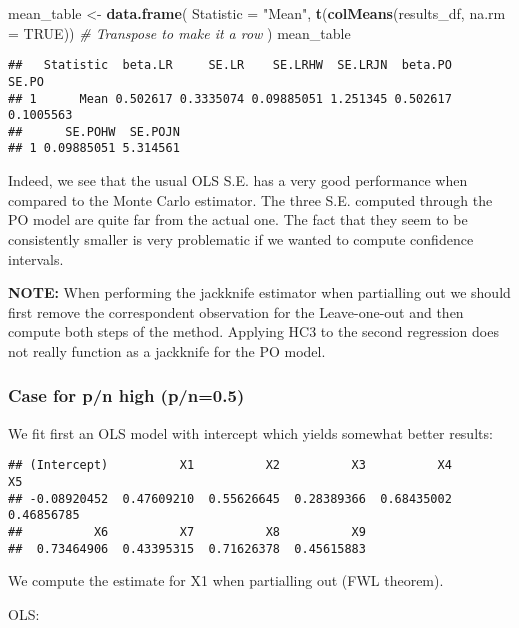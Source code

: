 \documentclass[
]{article}
\newenvironment{Shaded}{\begin{snugshade}}{\end{snugshade}}
\newcommand{\AttributeTok}[1]{\textcolor[rgb]{0.13,0.29,0.53}{#1}}
\newcommand{\CommentTok}[1]{\textcolor[rgb]{0.56,0.35,0.01}{\textit{#1}}}
\newcommand{\ConstantTok}[1]{\textcolor[rgb]{0.56,0.35,0.01}{#1}}
\newcommand{\FunctionTok}[1]{\textcolor[rgb]{0.13,0.29,0.53}{\textbf{#1}}}
\newcommand{\NormalTok}[1]{#1}
\newcommand{\OtherTok}[1]{\textcolor[rgb]{0.56,0.35,0.01}{#1}}
\newcommand{\StringTok}[1]{\textcolor[rgb]{0.31,0.60,0.02}{#1}}
\begin{document}
\begin{Shaded}
\begin{Highlighting}[]
\NormalTok{mean\_table }\OtherTok{\textless{}{-}} \FunctionTok{data.frame}\NormalTok{(}
  \AttributeTok{Statistic =} \StringTok{"Mean"}\NormalTok{,}
  \FunctionTok{t}\NormalTok{(}\FunctionTok{colMeans}\NormalTok{(results\_df, }\AttributeTok{na.rm =} \ConstantTok{TRUE}\NormalTok{))  }\CommentTok{\# Transpose to make it a row}
\NormalTok{)}
\NormalTok{mean\_table}
\end{Highlighting}
\end{Shaded}

\begin{verbatim}
##   Statistic  beta.LR     SE.LR    SE.LRHW  SE.LRJN  beta.PO     SE.PO
## 1      Mean 0.502617 0.3335074 0.09885051 1.251345 0.502617 0.1005563
##      SE.POHW  SE.POJN
## 1 0.09885051 5.314561
\end{verbatim}

Indeed, we see that the usual OLS S.E. has a very good performance when
compared to the Monte Carlo estimator. The three S.E. computed through
the PO model are quite far from the actual one. The fact that they seem
to be consistently smaller is very problematic if we wanted to compute
confidence intervals.

\textbf{NOTE:} When performing the jackknife estimator when partialling
out we should first remove the correspondent observation for the
Leave-one-out and then compute both steps of the method. Applying HC3 to
the second regression does not really function as a jackknife for the PO
model.

\subsubsection{Case for p/n high
(p/n=0.5)}\label{case-for-pn-high-pn0.5}

We fit first an OLS model with intercept which yields somewhat better
results:

\begin{verbatim}
## (Intercept)          X1          X2          X3          X4          X5 
## -0.08920452  0.47609210  0.55626645  0.28389366  0.68435002  0.46856785 
##          X6          X7          X8          X9 
##  0.73464906  0.43395315  0.71626378  0.45615883
\end{verbatim}

We compute the estimate for X1 when partialling out (FWL theorem).

OLS:
\end{document}
